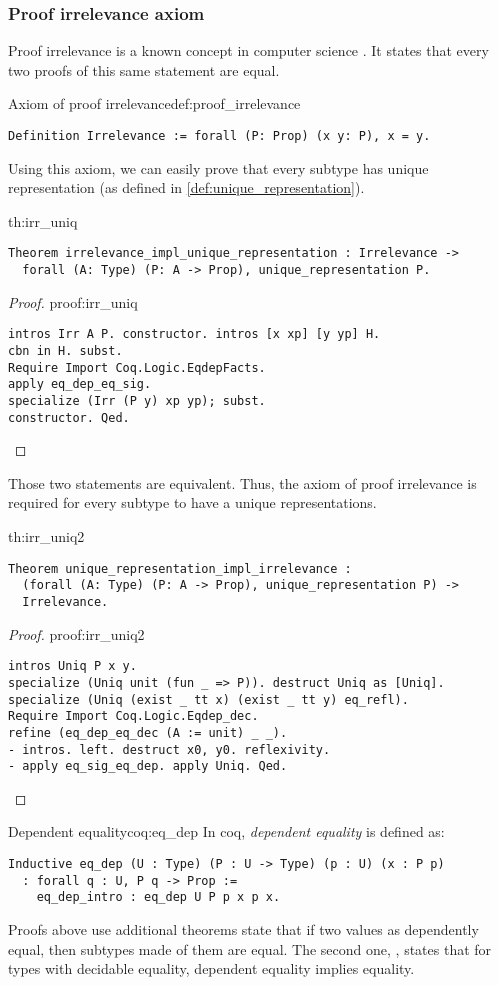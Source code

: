 \subsubsection{Proof irrelevance axiom}
Proof irrelevance is a known concept in computer science \cite{ProofIrrelevance}. It states that every two proofs of this same statement are equal.
\begin{defi}{Axiom of proof irrelevance}{def:proof_irrelevance}
\begin{verbatim}
Definition Irrelevance := forall (P: Prop) (x y: P), x = y.
\end{verbatim}
\end{defi}
Using this axiom, we can easily prove that every subtype has unique representation (as defined in \ref{def:unique_representation}).
\begin{theo}{}{th:irr_uniq}
    \begin{verbatim}
Theorem irrelevance_impl_unique_representation : Irrelevance -> 
  forall (A: Type) (P: A -> Prop), unique_representation P.
    \end{verbatim}
\end{theo}
\begin{proof}{}{proof:irr_uniq}
    \begin{verbatim}
intros Irr A P. constructor. intros [x xp] [y yp] H.
cbn in H. subst.
Require Import Coq.Logic.EqdepFacts.
apply eq_dep_eq_sig.
specialize (Irr (P y) xp yp); subst.
constructor. Qed.
\end{verbatim}
\end{proof}
Those two statements are equivalent. Thus, the axiom of proof irrelevance is required for every subtype to have a unique representations.
\begin{theo}{}{th:irr_uniq2}
    \begin{verbatim}
Theorem unique_representation_impl_irrelevance : 
  (forall (A: Type) (P: A -> Prop), unique_representation P) -> 
  Irrelevance.
    \end{verbatim}
\end{theo}
\begin{proof}{}{proof:irr_uniq2}
    \begin{verbatim}
intros Uniq P x y.
specialize (Uniq unit (fun _ => P)). destruct Uniq as [Uniq].
specialize (Uniq (exist _ tt x) (exist _ tt y) eq_refl).
Require Import Coq.Logic.Eqdep_dec.
refine (eq_dep_eq_dec (A := unit) _ _).
- intros. left. destruct x0, y0. reflexivity.
- apply eq_sig_eq_dep. apply Uniq. Qed.
\end{verbatim}
\end{proof}
\begin{coq}{Dependent equality}{coq:eq_dep}
In coq, \emph{dependent equality} is defined as:
\begin{verbatim}
Inductive eq_dep (U : Type) (P : U -> Type) (p : U) (x : P p) 
  : forall q : U, P q -> Prop :=
    eq_dep_intro : eq_dep U P p x p x.
\end{verbatim}
Proofs above use additional theorems  state that if two values as dependently equal, then subtypes made of them are equal. The second one, , states that for types with decidable equality, dependent equality implies equality.
\end{coq}

